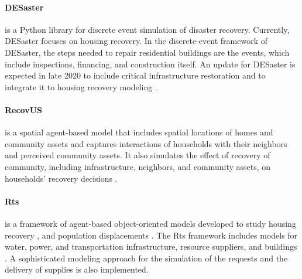 \paragraph{DESaster} is a Python library for discrete event simulation of disaster recovery. Currently, DESaster focuses on housing recovery. In the discrete-event framework of DESaster, the steps needed to repair residential buildings are the events, which include inspections, financing, and construction itself. An update for DESaster is expected in late 2020 to include critical infrastructure restoration and to integrate it to housing recovery modeling \citep{DESaster}.\ 

\paragraph{RecovUS}  is a spatial agent-based model that includes spatial locations of homes and community assets and captures interactions of households with their neighbors and perceived community assets. It also simulates the effect of recovery of community, including infrastructure, neighbors, and community assets, on households' recovery decisions \citep{moradi2020recovus}. 

\paragraph{Rts}  is a framework of agent-based object-oriented models developed to study housing recovery \citep{costa2020housing}, and population displacements \citep{costa2020predicting}. The Rts framework includes models for water, power, and transportation infrastructure, resource suppliers, and buildings \citep{Costa2019thesis}. A sophisticated modeling approach for the simulation of the requests and the delivery of supplies is also implemented. \ 
